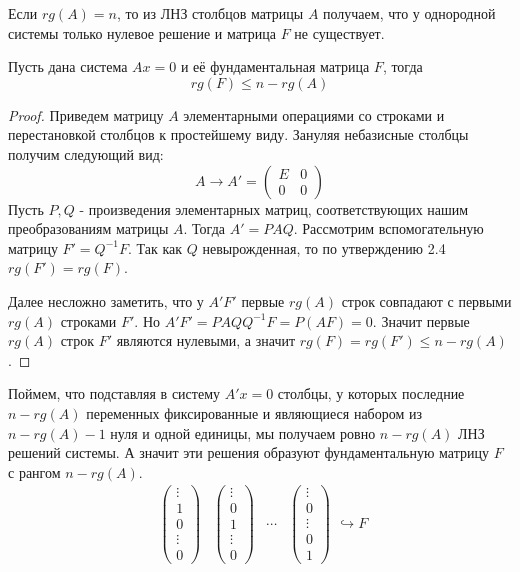 Если $rg(A)=n$, то из ЛНЗ столбцов матрицы $A$ получаем, что у однородной системы только нулевое решение и матрица $F$ не существует.
\begin{theorem}
    Пусть дана система $Ax=0$ и её фундаментальная матрица $F$, тогда \[rg(F) \leqslant n-rg(A)\]
\end{theorem}
\begin{proof} Приведем матрицу $A$ элементарными операциями со строками и перестановкой столбцов к простейшему виду. Зануляя небазисные столбцы получим следующий вид:
\[A \longrightarrow A'=
\left(
    \begin{array}{c|c}
    E & 0 \\
    \hline
    0 & 0
    \end{array}
\right)
\]
Пусть $P, Q$ - произведения элементарных матриц, соответствующих нашим преобразованиям матрицы $A$. Тогда $A'=PAQ$. Рассмотрим вспомогательную матрицу $F'=Q^{-1}F$. Так как $Q$ невырожденная, то по утверждению 2.4 $rg(F')=rg(F)$. 

Далее несложно заметить, что у $A'F'$ первые $rg(A)$ строк совпадают с первыми $rg(A)$ строками $F'$. Но $A'F'=PAQQ^{-1}F=P(AF)=0$. Значит первые $rg(A)$ строк $F'$ являются нулевыми, а значит $rg(F)=rg(F') \leqslant n-rg(A)$.
\end{proof}
Поймем, что подставляя в систему $A'x=0$ столбцы, у которых последние $n-rg(A)$ переменных фиксированные и являющиеся набором из $n-rg(A) -1$ нуля и одной единицы, мы получаем ровно $n-rg(A)$ ЛНЗ решений системы. А значит эти решения образуют фундаментальную матрицу $F$ с рангом $n-rg(A)$.
\[
\begin{array}{cccc}
\begin{pmatrix}
\vdots \\
1 \\
0 \\
\vdots \\
0
\end{pmatrix} & 
\begin{pmatrix}
\vdots \\
0 \\
1 \\
\vdots \\
0
\end{pmatrix} & 
\cdots & 
\begin{pmatrix}
\vdots \\
0 \\
\vdots \\
0 \\
1
\end{pmatrix}
\end{array}
\hookrightarrow F
\]
